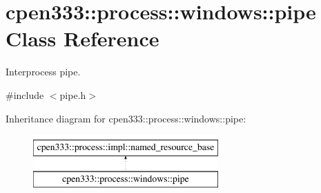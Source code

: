 \hypertarget{classcpen333_1_1process_1_1windows_1_1pipe}{}\section{cpen333\+:\+:process\+:\+:windows\+:\+:pipe Class Reference}
\label{classcpen333_1_1process_1_1windows_1_1pipe}


Interprocess pipe.  




{\ttfamily \#include $<$pipe.\+h$>$}

Inheritance diagram for cpen333\+:\+:process\+:\+:windows\+:\+:pipe\+:\begin{figure}[H]
\begin{center}
\leavevmode
\includegraphics[height=2.000000cm]{classcpen333_1_1process_1_1windows_1_1pipe}
\end{center}
\end{figure}
